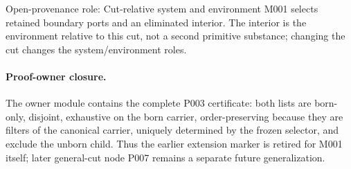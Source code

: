 \begin{cnnaInfoBox}{Open-provenance role: Cut-relative system and environment}
M001 selects retained boundary ports and an eliminated interior.  The interior is the environment relative to this cut, not a second primitive substance; changing the cut changes the system/environment roles.
\end{cnnaInfoBox}

\paragraph*{Proof-owner closure.}
The owner module contains the complete P003 certificate: both lists are
born-only, disjoint, exhaustive on the born carrier, order-preserving because
they are filters of the canonical carrier, uniquely determined by the frozen
selector, and exclude the unborn child.  Thus the earlier extension marker is
retired for M001 itself; later general-cut node P007 remains a separate future
generalization.
